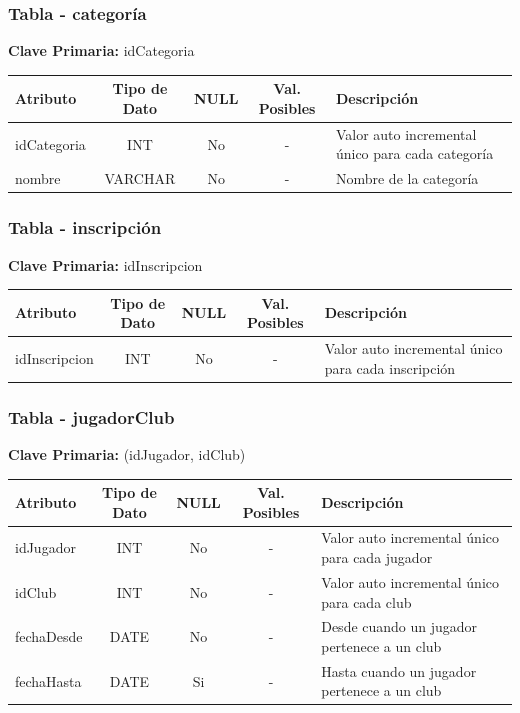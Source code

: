 \subsubsection{Tabla - categoría}

\textbf{Clave Primaria: } idCategoria

\begin{table}[H]
	\centering
	\begin{tabularx}{\textwidth}{|l|c|c|c|X|} \hline
		\textbf{Atributo} & \textbf{Tipo de Dato} & \textbf{NULL} & \textbf{Val. Posibles} & \textbf{Descripción} \\ \hline
		idCategoria & INT & No & - & Valor auto incremental único para cada categoría \\ \hline
		nombre & VARCHAR & No & - & Nombre de la categoría \\ \hline
	\end{tabularx}
\end{table}

\subsubsection{Tabla - inscripción}

\textbf{Clave Primaria: } idInscripcion

\begin{table}[H]
	\centering
	\begin{tabularx}{\textwidth}{|l|c|c|c|X|} \hline
		\textbf{Atributo} & \textbf{Tipo de Dato} & \textbf{NULL} & \textbf{Val. Posibles} & \textbf{Descripción} \\ \hline
		idInscripcion & INT & No & - & Valor auto incremental único para cada inscripción \\ \hline
	\end{tabularx}
\end{table}

\subsubsection{Tabla - jugadorClub}

\textbf{Clave Primaria: } (idJugador, idClub)

\begin{table}[H]
	\centering
	\begin{tabularx}{\textwidth}{|l|c|c|c|X|} \hline
		\textbf{Atributo} & \textbf{Tipo de Dato} & \textbf{NULL} & \textbf{Val. Posibles} & \textbf{Descripción} \\ \hline
		idJugador & INT & No & - & Valor auto incremental único para cada jugador \\ \hline
		idClub & INT & No & - & Valor auto incremental único para cada club \\ \hline
		fechaDesde & DATE & No & - & Desde cuando un jugador pertenece a un club \\ \hline
		fechaHasta & DATE & Si & - & Hasta cuando un jugador pertenece a un club \\ \hline
	\end{tabularx}
\end{table}


